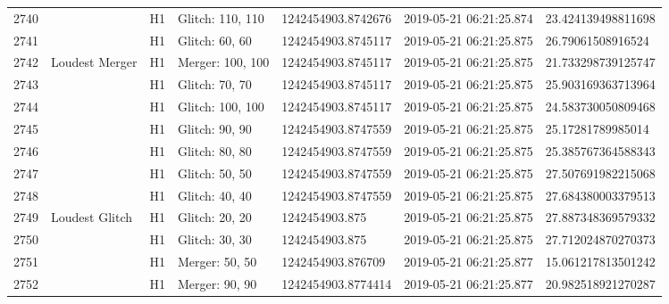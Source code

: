 \begin{longtable}{lllllll}
2740 &                                                    &       H1 &  Glitch: 110, 110 &  1242454903.8742676 &  2019-05-21 06:21:25.874 &  23.424139498811698 \\
2741 &                                                    &       H1 &    Glitch: 60, 60 &  1242454903.8745117 &  2019-05-21 06:21:25.875 &   26.79061508916524 \\
2742 &                                     Loudest Merger &       H1 &  Merger: 100, 100 &  1242454903.8745117 &  2019-05-21 06:21:25.875 &  21.733298739125747 \\
2743 &                                                    &       H1 &    Glitch: 70, 70 &  1242454903.8745117 &  2019-05-21 06:21:25.875 &  25.903169363713964 \\
2744 &                                                    &       H1 &  Glitch: 100, 100 &  1242454903.8745117 &  2019-05-21 06:21:25.875 &  24.583730050809468 \\
2745 &                                                    &       H1 &    Glitch: 90, 90 &  1242454903.8747559 &  2019-05-21 06:21:25.875 &   25.17281789985014 \\
2746 &                                                    &       H1 &    Glitch: 80, 80 &  1242454903.8747559 &  2019-05-21 06:21:25.875 &  25.385767364588343 \\
2747 &                                                    &       H1 &    Glitch: 50, 50 &  1242454903.8747559 &  2019-05-21 06:21:25.875 &  27.507691982215068 \\
2748 &                                                    &       H1 &    Glitch: 40, 40 &  1242454903.8747559 &  2019-05-21 06:21:25.875 &  27.684380003379513 \\
2749 &                                     Loudest Glitch &       H1 &    Glitch: 20, 20 &      1242454903.875 &  2019-05-21 06:21:25.875 &  27.887348369579332 \\
2750 &                                                    &       H1 &    Glitch: 30, 30 &      1242454903.875 &  2019-05-21 06:21:25.875 &  27.712024870270373 \\
2751 &                                                    &       H1 &    Merger: 50, 50 &   1242454903.876709 &  2019-05-21 06:21:25.877 &  15.061217813501242 \\
2752 &                                                    &       H1 &    Merger: 90, 90 &  1242454903.8774414 &  2019-05-21 06:21:25.877 &  20.982518921270287 \\

\end{longtable}
